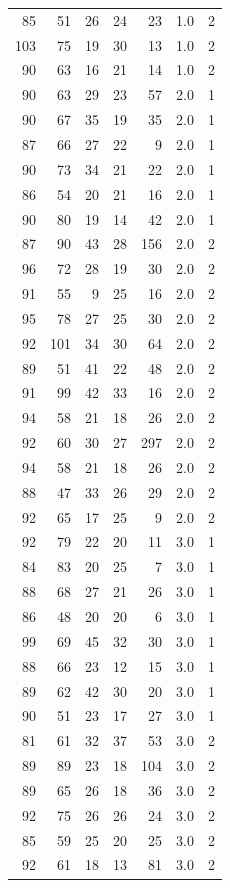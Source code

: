 \documentclass[
  11pt,
  a4paper,
]{scrartcl}
\begin{document}
\begin{longtable}[]{@{}rrrrrrl@{}}
85 & 51 & 26 & 24 & 23 & 1.0 & 2 \\
103 & 75 & 19 & 30 & 13 & 1.0 & 2 \\
90 & 63 & 16 & 21 & 14 & 1.0 & 2 \\
90 & 63 & 29 & 23 & 57 & 2.0 & 1 \\
90 & 67 & 35 & 19 & 35 & 2.0 & 1 \\
87 & 66 & 27 & 22 & 9 & 2.0 & 1 \\
90 & 73 & 34 & 21 & 22 & 2.0 & 1 \\
86 & 54 & 20 & 21 & 16 & 2.0 & 1 \\
90 & 80 & 19 & 14 & 42 & 2.0 & 1 \\
87 & 90 & 43 & 28 & 156 & 2.0 & 2 \\
96 & 72 & 28 & 19 & 30 & 2.0 & 2 \\
91 & 55 & 9 & 25 & 16 & 2.0 & 2 \\
95 & 78 & 27 & 25 & 30 & 2.0 & 2 \\
92 & 101 & 34 & 30 & 64 & 2.0 & 2 \\
89 & 51 & 41 & 22 & 48 & 2.0 & 2 \\
91 & 99 & 42 & 33 & 16 & 2.0 & 2 \\
94 & 58 & 21 & 18 & 26 & 2.0 & 2 \\
92 & 60 & 30 & 27 & 297 & 2.0 & 2 \\
94 & 58 & 21 & 18 & 26 & 2.0 & 2 \\
88 & 47 & 33 & 26 & 29 & 2.0 & 2 \\
92 & 65 & 17 & 25 & 9 & 2.0 & 2 \\
92 & 79 & 22 & 20 & 11 & 3.0 & 1 \\
84 & 83 & 20 & 25 & 7 & 3.0 & 1 \\
88 & 68 & 27 & 21 & 26 & 3.0 & 1 \\
86 & 48 & 20 & 20 & 6 & 3.0 & 1 \\
99 & 69 & 45 & 32 & 30 & 3.0 & 1 \\
88 & 66 & 23 & 12 & 15 & 3.0 & 1 \\
89 & 62 & 42 & 30 & 20 & 3.0 & 1 \\
90 & 51 & 23 & 17 & 27 & 3.0 & 1 \\
81 & 61 & 32 & 37 & 53 & 3.0 & 2 \\
89 & 89 & 23 & 18 & 104 & 3.0 & 2 \\
89 & 65 & 26 & 18 & 36 & 3.0 & 2 \\
92 & 75 & 26 & 26 & 24 & 3.0 & 2 \\
85 & 59 & 25 & 20 & 25 & 3.0 & 2 \\
92 & 61 & 18 & 13 & 81 & 3.0 & 2 \\

\end{longtable}
\end{document}
